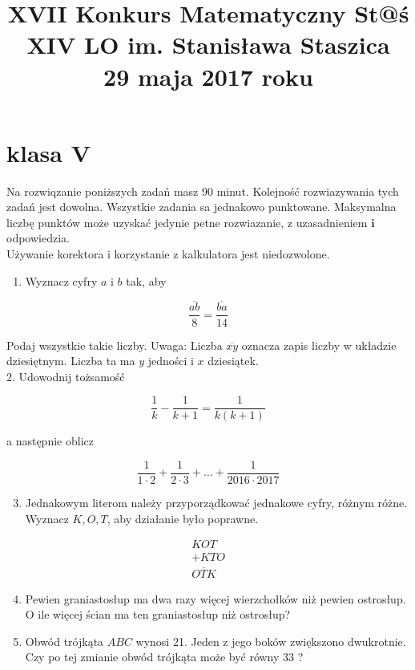 \documentclass[10pt]{article}
\title{XVII Konkurs Matematyczny St@ś \\
 XIV LO im. Stanisława Staszica \\
 29 maja 2017 roku }
\author{}
\date{}
\begin{document}
\maketitle
\section*{klasa V}
Na rozwiqzanie poniższych zadań masz 90 minut. Kolejność rozwiazywania tych zadań jest dowolna. Wszystkie zadania sa jednakowo punktowane. Maksymalna liczbę punktów może uzyskać jedynie petne rozwiazanie, z uzasadnieniem \(\boldsymbol{i}\) odpowiedzia.\\
Używanie korektora i korzystanie z kalkulatora jest niedozwolone.

\begin{enumerate}
  \item Wyznacz cyfry \(a\) i \(b\) tak, aby
\end{enumerate}

\[
\frac{\overline{a b}}{8}=\frac{\overline{b a}}{14}
\]

Podaj wszystkie takie liczby. Uwaga: Liczba \(\overline{x y}\) oznacza zapis liczby w układzie dziesiętnym. Liczba ta ma \(y\) jedności i \(x\) dziesiątek.\\
2. Udowodnij tożsamość

\[
\frac{1}{k}-\frac{1}{k+1}=\frac{1}{k(k+1)}
\]

a następnie oblicz

\[
\frac{1}{1 \cdot 2}+\frac{1}{2 \cdot 3}+\ldots+\frac{1}{2016 \cdot 2017}
\]

\begin{enumerate}
  \setcounter{enumi}{2}
  \item Jednakowym literom należy przyporządkować jednakowe cyfry, różnym różne. Wyznacz \(K, O, T\), aby działanie było poprawne.
\end{enumerate}

\[
\begin{array}{r}
K O T \\
+K T O \\
\hline \overline{O T K}
\end{array}
\]

\begin{enumerate}
  \setcounter{enumi}{3}
  \item Pewien graniastosłup ma dwa razy więcej wierzchołków niż pewien ostrosłup. O ile więcej ścian ma ten graniastosłup niż ostrosłup?
  \item Obwód trójkąta \(A B C\) wynosi 21. Jeden z jego boków zwiększono dwukrotnie. Czy po tej zmianie obwód trójkąta może być równy 33 ?
\end{enumerate}
\end{document}
